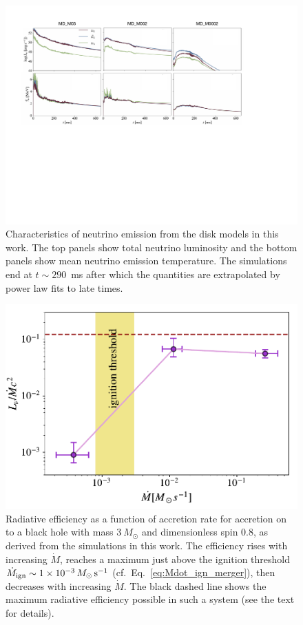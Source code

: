 \begin{figure}[t]
  \includegraphics[width=\textwidth]{figures/kilonova/Lum_temp_nu_plots.pdf}
 \caption{Characteristics of neutrino emission from the disk models in this work. The top panels show total neutrino luminosity and the bottom panels show mean neutrino emission temperature. The simulations end at $t \sim\!290$~ms after which the quantities are extrapolated by power law fits to late times.\label{fig:Lum_temp_nu}}
\end{figure}

\begin{figure}[t]
  \includegraphics[width=\columnwidth]{figures/kilonova/lum_mdot.pdf}
 \caption{Radiative efficiency as a function of accretion rate for accretion on to a black hole with mass $3~M_\odot$ and dimensionless spin 0.8, as derived from the simulations in this work. The efficiency rises with increasing $\dot M$, reaches a maximum just above the ignition threshold $\dot{M}_{\rm ign}\sim 1\times 10^{-3}\,M_\odot\,{\rm s}^{-1}$ (cf.~Eq.~\eqref{eq:Mdot_ign_merger}), then decreases with increasing $\dot M$. The black dashed line shows the maximum radiative efficiency possible in such a system (see the text for details).\label{fig:lum-mdot}}
\end{figure}

